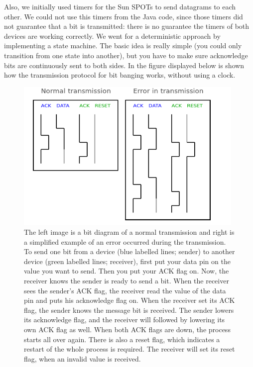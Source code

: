 \documentclass[a4paper,10pt]{article} %
\begin{document}
Also, we initially used timers for the Sun SPOTs to send datagrams to each
other. We could not use this timers from the Java code, since those timers did
not guarantee that a bit is transmitted: there is no guarantee the timers of
both devices are working correctly. We went for a deterministic approach by
implementing a state machine. The basic idea is really simple (you could only
transition from one state into another), but you have to make sure acknowledge
bits are continuously sent to both sides. In the figure displayed below is
shown how the transmission protocol for bit banging works, without using a
clock.

\begin{figure}[H]
\label{fig:handshaking}
\centering
\includegraphics[width=11cm]{img/handshaking.png}
\caption{The left image is a bit diagram of a normal transmission and right is a
simplified example of an error occurred during the transmission. To send one bit
from a device (blue labelled lines; sender) to another device (green labelled
lines; receiver), first put your data pin on the value you want to send. Then
you put your ACK flag on. Now, the receiver knows the sender is ready to send a
bit.  When the receiver sees the sender's ACK flag, the receiver read the value
of the data pin and puts his acknowledge flag on. When the receiver set its ACK
flag, the sender knows the message bit is received. The sender lowers its
acknowledge flag, and the receiver will followed by lowering its own ACK flag as
well. When both ACK flags are down, the process starts all over again. There is
also a reset flag, which indicates a restart of the whole process is required.
The receiver will set its reset flag, when an invalid value is received.}
\end{figure}
\end{document}
